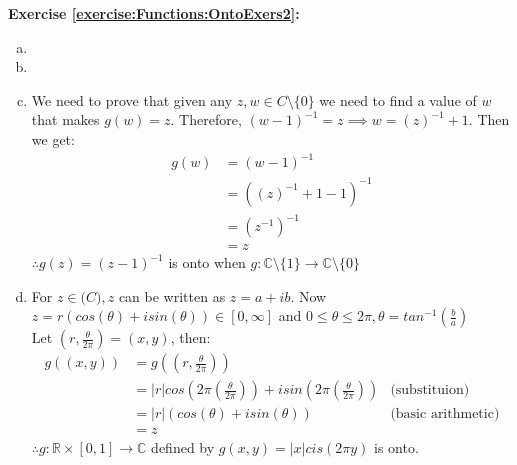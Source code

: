 \noindent\textbf{Exercise \ref{exercise:Functions:OntoExers2}:} %
\begin{enumerate}[(a)]
\item

\item

\item
We need to prove that given any $z,w\in C\setminus \{0\}$ we need to find a value of $w$ that makes $g(w)=z$. Therefore, $(w-1)^{-1}=z \implies w=(z)^{-1}+1$. Then we get:
\begin{align*}
g(w) &=(w-1)^{-1}\\
&=((z)^{-1}+1-1)^{-1}\\
&=(z^{-1})^{-1}\\
&=z
\end{align*}
$\therefore g(z)=(z-1)^{-1}$ is onto when $g\colon {\mathbb C}\setminus \{1\}\to {\mathbb C}\setminus \{0\}$

\item
For $z\in \mathbb(C), z$ can be written as $z=a+ib$. Now $z=r(cos(\theta)+isin(\theta))\in [0,\infty]$ and $0\leq \theta \leq 2\pi, \theta=tan^{-1}(\frac{b}{a})$\\
Let $(r,\frac{\theta}{2\pi})=(x,y)$, then:
\begin{align*}
g((x,y))&=g((r,\frac{\theta}{2\pi})) &\\
&=|r|cos(2\pi(\frac{\theta}{2\pi}))+isin(2\pi(\frac{\theta}{2\pi})) & \text{(substituion)} \\
&=|r|(cos(\theta)+isin(\theta)) & \text{(basic arithmetic)}\\
&=z 
\end{align*}
$\therefore g\colon \mathbb{R}\times [0,1]\to \mathbb{C}$ defined by $g(x,y)=|x|cis(2\pi y)$ is onto.
\end{enumerate}

